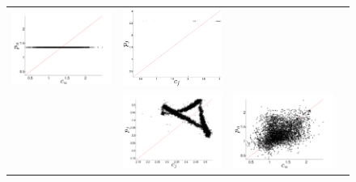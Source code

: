 \begin{figure}
\begin{tabular}{m{}|CCC}
    \includegraphics[width=0.6\columnwidth]{figs/gccMeanForecast} &
    \includegraphics[width=0.6\columnwidth]{figs/svdfiveMeanForecast} \\
     &
    \includegraphics[width=0.6\columnwidth]{figs/colARIMAForecast} &
    \includegraphics[width=0.6\columnwidth]{figs/gccARIMAForecast} &

\end{tabular}
\end{figure}
